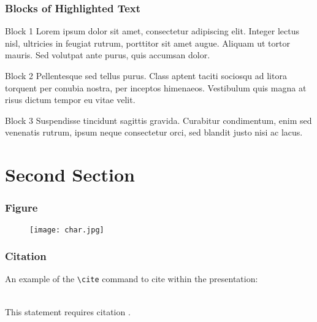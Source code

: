 \documentclass[pdf]{beamer}
\begin{document}
\begin{frame}
\frametitle{Masalah}}
\begin{itemize}
\item Display:
\item Windows Encoding:
\end{itemize}
\end{frame}

\begin{frame}
\frametitle{Blocks of Highlighted Text}
\begin{block}{Block 1}
Lorem ipsum dolor sit amet, consectetur adipiscing elit. Integer lectus nisl, ultricies in feugiat rutrum, porttitor sit amet augue. Aliquam ut tortor mauris. Sed volutpat ante purus, quis accumsan dolor.
\end{block}

\begin{block}{Block 2}
Pellentesque sed tellus purus. Class aptent taciti sociosqu ad litora torquent per conubia nostra, per inceptos himenaeos. Vestibulum quis magna at risus dictum tempor eu vitae velit.
\end{block}

\begin{block}{Block 3}
Suspendisse tincidunt sagittis gravida. Curabitur condimentum, enim sed venenatis rutrum, ipsum neque consectetur orci, sed blandit justo nisi ac lacus.
\end{block}
\end{frame}



\section{Second Section}


\begin{frame}
\frametitle{Figure}
\begin{figure}
\texttt{[image: char.jpg]}
\end{figure}
\end{frame}


\begin{frame}[fragile] %
\frametitle{Citation}
An example of the \verb|\cite| command to cite within the presentation:\\~

This statement requires citation \cite{p1}.
\end{frame}
\end{document}
